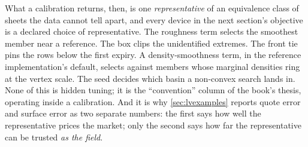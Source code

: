 What a
calibration returns, then, is one \emph{representative} of an equivalence
class of sheets the data cannot tell apart, and every device in the
next section's objective is a declared choice of representative.  The
roughness term selects the smoothest member near a reference.  The box
clips the unidentified extremes.  The front tie pins the rows below
the first expiry.  A density-smoothness term, in the reference
implementation's default, selects against members whose marginal
densities ring at the vertex scale.  The seed decides which basin a
non-convex search lands in.  None of this is hidden tuning; it is the
``convention''
column of the book's thesis, operating inside a calibration.  And it
is why \cref{sec:lvexamples} reports quote error and surface error as
two separate numbers: the first says how well the representative
prices the market; only the second says how far the representative can
be trusted \emph{as the field}.
